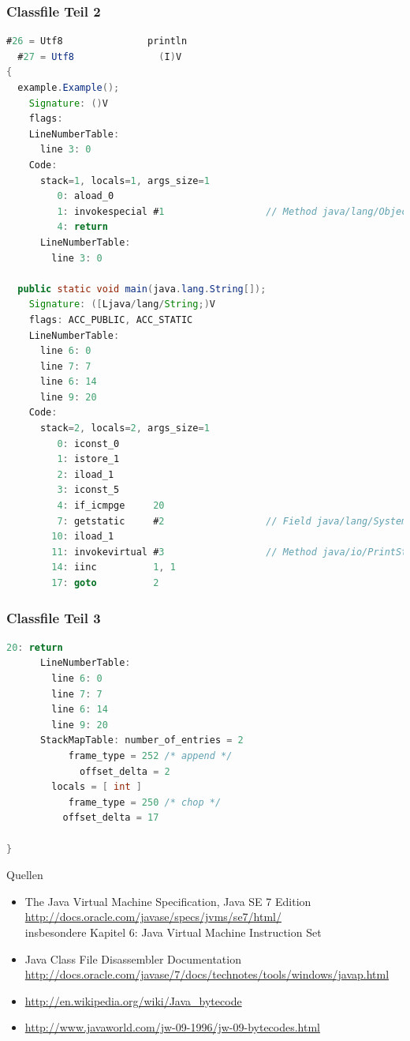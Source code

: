 \documentclass[10pt]{beamer}
\begin{document}
\begin{frame}[fragile]
\frametitle{Classfile Teil 2}
\begin{lstlisting}[language=Java,basicstyle=\ttfamily\tiny,firstnumber=36]
  #26 = Utf8               println
  #27 = Utf8               (I)V
{
  example.Example();
    Signature: ()V
    flags: 
    LineNumberTable:
      line 3: 0
    Code:
      stack=1, locals=1, args_size=1
         0: aload_0       
         1: invokespecial #1                  // Method java/lang/Object."<init>":()V
         4: return        
      LineNumberTable:
        line 3: 0

  public static void main(java.lang.String[]);
    Signature: ([Ljava/lang/String;)V
    flags: ACC_PUBLIC, ACC_STATIC
    LineNumberTable:
      line 6: 0
      line 7: 7
      line 6: 14
      line 9: 20
    Code:
      stack=2, locals=2, args_size=1
         0: iconst_0      
         1: istore_1      
         2: iload_1       
         3: iconst_5      
         4: if_icmpge     20
         7: getstatic     #2                  // Field java/lang/System.out:Ljava/io/PrintStream;
        10: iload_1       
        11: invokevirtual #3                  // Method java/io/PrintStream.println:(I)V
        14: iinc          1, 1
        17: goto          2
\end{lstlisting}
\end{frame}

\begin{frame}[fragile]
\frametitle{Classfile Teil 3}
\begin{lstlisting}[language=Java,basicstyle=\ttfamily\tiny,firstnumber=72]
        20: return        
      LineNumberTable:
        line 6: 0
        line 7: 7
        line 6: 14
        line 9: 20
      StackMapTable: number_of_entries = 2
           frame_type = 252 /* append */
             offset_delta = 2
        locals = [ int ]
           frame_type = 250 /* chop */
          offset_delta = 17

}
\end{lstlisting}
\end{frame}


\begin{frame}{Quellen}
\begin{itemize}
\item The Java Virtual Machine Specification, Java SE 7 Edition\\
\url{http://docs.oracle.com/javase/specs/jvms/se7/html/}\\
insbesondere Kapitel 6: Java Virtual Machine Instruction Set
\item Java Class File Disassembler Documentation\\
\url{http://docs.oracle.com/javase/7/docs/technotes/tools/windows/javap.html}
\item \url{http://en.wikipedia.org/wiki/Java_bytecode}
\item \url{http://www.javaworld.com/jw-09-1996/jw-09-bytecodes.html}
\end{itemize}
\end{frame}
\end{document}
